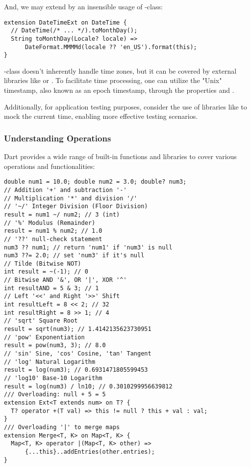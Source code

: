 \noindent And, we may extend  by an insensible usage of -class:

\begin{lstlisting}
extension DateTimeExt on DateTime {
  // DateTime(/* ... */).toMonthDay();
  String toMonthDay(Locale? locale) =>
      DateFormat.MMMMd(locale ?? 'en_US').format(this);
}
\end{lstlisting}

\noindent {}-class doesn't inherently handle time zones, but it can be covered by external libraries like
 or . To facilitate time processing, one can utilize the "Unix" timestamp, also known as an epoch
timestamp, through the properties  and .

Additionally, for application testing purposes, consider the use of libraries like  to mock the
current time, enabling more effective testing scenarios.

\newpage
\subsubsection{Understanding Operations}

Dart provides a wide range of built-in functions and libraries to cover various operations and functionalities:

\begin{lstlisting}
double num1 = 10.0; double num2 = 3.0; double? num3;
// Addition '+' and subtraction '-'
// Multiplication '*' and division '/'
// '~/' Integer Division (Floor Division)
result = num1 ~/ num2; // 3 (int)
// '%' Modulus (Remainder)
result = num1 % num2; // 1.0
// '??' null-check statement
num3 ?? num1; // return 'num1' if 'num3' is null
num3 ??= 2.0; // set 'num3' if it's null
// Tilde (Bitwise NOT)
int result = ~(-1); // 0
// Bitwise AND '&', OR '|', XOR '^'
int resultAND = 5 & 3; // 1
// Left '<<' and Right '>>' Shift
int resultLeft = 8 << 2; // 32
int resultRight = 8 >> 1; // 4
// 'sqrt' Square Root
result = sqrt(num3); // 1.4142135623730951
// 'pow' Exponentiation
result = pow(num3, 3); // 8.0
// 'sin' Sine, 'cos' Cosine, 'tan' Tangent
// 'log' Natural Logarithm
result = log(num3); // 0.6931471805599453
// 'log10' Base-10 Logarithm
result = log(num3) / ln10; // 0.3010299956639812
/// Overloading: null + 5 = 5
extension Ext<T extends num> on T? {
  T? operator +(T val) => this != null ? this + val : val;
}
/// Overloading '|' to merge maps
extension Merge<T, K> on Map<T, K> {
  Map<T, K> operator |(Map<T, K> other) =>
      {...this}..addEntries(other.entries);
}
\end{lstlisting}


